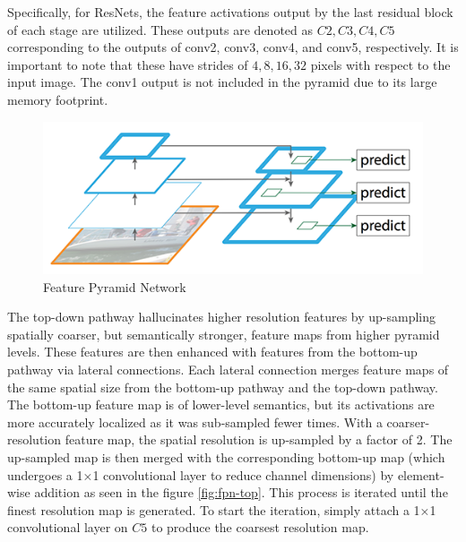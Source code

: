 Specifically, for ResNets, the feature activations output by the last residual block of each stage are utilized. These outputs are denoted as ${C2, C3, C4, C5}$ 
corresponding to the outputs of conv2, conv3, conv4, and conv5, respectively. It is important to note that these have strides of ${4, 8, 16, 32}$ pixels with 
respect to the input image. The conv1 output is not included in the pyramid due to its large memory footprint.

\begin{figure}[h!]
    \centering
    \includegraphics[scale=0.5]{Figures/fpn-base.png}
    \caption{Feature Pyramid Network}
    \label{fig:fpn}
\end{figure}

The top-down pathway hallucinates higher resolution features by up-sampling spatially coarser, but semantically stronger, feature maps from higher pyramid levels. 
These features are then enhanced with features from the bottom-up pathway via lateral connections. Each lateral connection merges feature maps of the same 
spatial size from the bottom-up pathway and the top-down pathway. The bottom-up feature map is of lower-level semantics, but its activations are more accurately 
localized as it was sub-sampled fewer times. With a coarser-resolution feature map, the spatial resolution is up-sampled by a factor of 2. The up-sampled map is 
then merged with the corresponding bottom-up map (which undergoes a 1×1 convolutional layer to reduce channel dimensions) by element-wise addition 
as seen in the figure \ref{fig:fpn-top}. This process is iterated until the finest resolution map is generated. To start the iteration, simply attach a 
1×1 convolutional layer on $C5$ to  produce the coarsest resolution map. 

